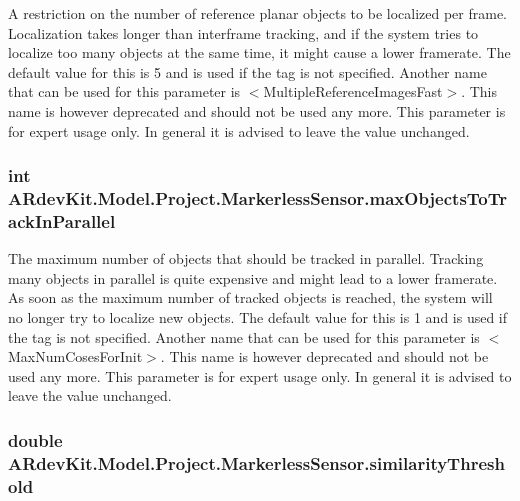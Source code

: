 A restriction on the number of reference planar objects to be localized per frame. Localization takes longer than interframe tracking, and if the system tries to localize too many objects at the same time, it might cause a lower framerate. The default value for this is 5 and is used if the tag is not specified. Another name that can be used for this parameter is $<$Multiple\-Reference\-Images\-Fast$>$. This name is however deprecated and should not be used any more. This parameter is for expert usage only. In general it is advised to leave the value unchanged. 

\hypertarget{class_a_rdev_kit_1_1_model_1_1_project_1_1_markerless_sensor_a8c9de52d508a5cb8adf1920438c5f6cb}{
\subsubsection[{max\-Objects\-To\-Track\-In\-Parallel}]{\setlength{\rightskip}{0pt plus 5cm}int A\-Rdev\-Kit.\-Model.\-Project.\-Markerless\-Sensor.\-max\-Objects\-To\-Track\-In\-Parallel\hspace{0.3cm}{\ttfamily [protected]}}}\label{class_a_rdev_kit_1_1_model_1_1_project_1_1_markerless_sensor_a8c9de52d508a5cb8adf1920438c5f6cb}


The maximum number of objects that should be tracked in parallel. Tracking many objects in parallel is quite expensive and might lead to a lower framerate. As soon as the maximum number of tracked objects is reached, the system will no longer try to localize new objects. The default value for this is 1 and is used if the tag is not specified. Another name that can be used for this parameter is $<$Max\-Num\-Coses\-For\-Init$>$. This name is however deprecated and should not be used any more. This parameter is for expert usage only. In general it is advised to leave the value unchanged. 

\hypertarget{class_a_rdev_kit_1_1_model_1_1_project_1_1_markerless_sensor_aacf707617c0782991ff6f490aabcf37d}{
\subsubsection[{similarity\-Threshold}]{\setlength{\rightskip}{0pt plus 5cm}double A\-Rdev\-Kit.\-Model.\-Project.\-Markerless\-Sensor.\-similarity\-Threshold\hspace{0.3cm}{\ttfamily [protected]}}}\label{class_a_rdev_kit_1_1_model_1_1_project_1_1_markerless_sensor_aacf707617c0782991ff6f490aabcf37d}


